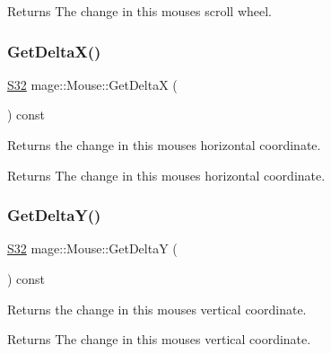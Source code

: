 \begin{DoxyReturn}{Returns}
The change in this mouse\textquotesingle{}s scroll wheel. 
\end{DoxyReturn}
\hypertarget{classmage_1_1_mouse_a1f6c7164c1705d834c2f603f22398077}{}\label{classmage_1_1_mouse_a1f6c7164c1705d834c2f603f22398077} 
\subsubsection{\texorpdfstring{Get\+Delta\+X()}{GetDeltaX()}}
{\footnotesize\ttfamily \hyperlink{namespacemage_a642e05c5c83642b6946703615cdbf2da}{S32} mage\+::\+Mouse\+::\+Get\+DeltaX (\begin{DoxyParamCaption}{ }\end{DoxyParamCaption}) const\hspace{0.3cm}{\ttfamily [noexcept]}}

Returns the change in this mouse\textquotesingle{}s horizontal coordinate.

\begin{DoxyReturn}{Returns}
The change in this mouse\textquotesingle{}s horizontal coordinate. 
\end{DoxyReturn}
\hypertarget{classmage_1_1_mouse_a95da9aa89fc63d4d96666da52e63d558}{}\label{classmage_1_1_mouse_a95da9aa89fc63d4d96666da52e63d558} 
\subsubsection{\texorpdfstring{Get\+Delta\+Y()}{GetDeltaY()}}
{\footnotesize\ttfamily \hyperlink{namespacemage_a642e05c5c83642b6946703615cdbf2da}{S32} mage\+::\+Mouse\+::\+Get\+DeltaY (\begin{DoxyParamCaption}{ }\end{DoxyParamCaption}) const\hspace{0.3cm}{\ttfamily [noexcept]}}

Returns the change in this mouse\textquotesingle{}s vertical coordinate.

\begin{DoxyReturn}{Returns}
The change in this mouse\textquotesingle{}s vertical coordinate. 
\end{DoxyReturn}
\hypertarget{classmage_1_1_mouse_a9c8d4493c86685b259819b5995a17c7a}{}\label{classmage_1_1_mouse_a9c8d4493c86685b259819b5995a17c7a} 
